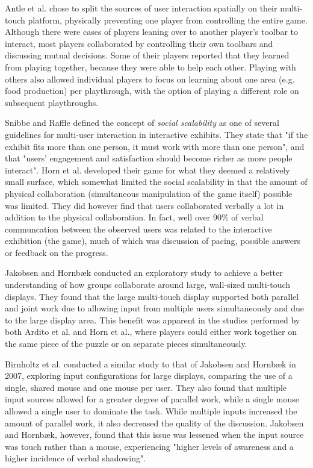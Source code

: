 Antle et al. chose to split the sources of user interaction spatially on their multi-touch platform, physically preventing one player from controlling the entire game. Although there were cases of players leaning over to another player's toolbar to interact, most players collaborated by controlling their own toolbars and discussing mutual decisions. Some of their players reported that they learned from playing together, because they were able to help each other. Playing with others also allowed individual players to focus on learning about one area (e.g. food production) per playthrough, with the option of playing a different role on subsequent playthroughs.

Snibbe and Raffle\citep{Snibbe} defined the concept of \emph{social scalability} as one of several guidelines for multi-user interaction in interactive exhibits. They state that "if the exhibit fits more than one person, it must work with more than one person", and that "users’ engagement and satisfaction should become richer as more people interact". Horn et al. developed their game for what they deemed a relatively small surface, which somewhat limited the social scalability in that the amount of physical collaboration (simultaneous manipulation of the game itself) possible was limited. They did however find that users collaborated verbally a lot in addition to the physical collaboration. In fact, well over 90\% of verbal communcation between the observed users was related to the interactive exhibition (the game), much of which was discussion of pacing, possible answers or feedback on the progress.

Jakobsen and Hornbæk\citep{Jakobsen} conducted an exploratory study to achieve a better understanding of how groups collaborate around large, wall-sized multi-touch displays. They found that the large multi-touch display supported both parallel and joint work due to allowing input from multiple users simultaneously and due to the large display area. This benefit was apparent in the studies performed by both Ardito et al. and Horn et al., where players could either work together on the same piece of the puzzle or on separate pieces simultaneously.

Birnholtz et al.\citep{Birnholtz} conducted a similar study to that of Jakobsen and Hornbæk in 2007, exploring input configurations for large displays, comparing the use of a single, shared mouse and one mouse per user. They also found that multiple input sources allowed for a greater degree of parallel work, while a single mouse allowed a single user to dominate the task. While multiple inputs increased the amount of parallel work, it also decreased the quality of the discussion. Jakobsen and Hornbæk, however, found that this issue was lessened when the input source was touch rather than a mouse, experiencing "higher levels of awareness and a higher incidence of verbal shadowing".

